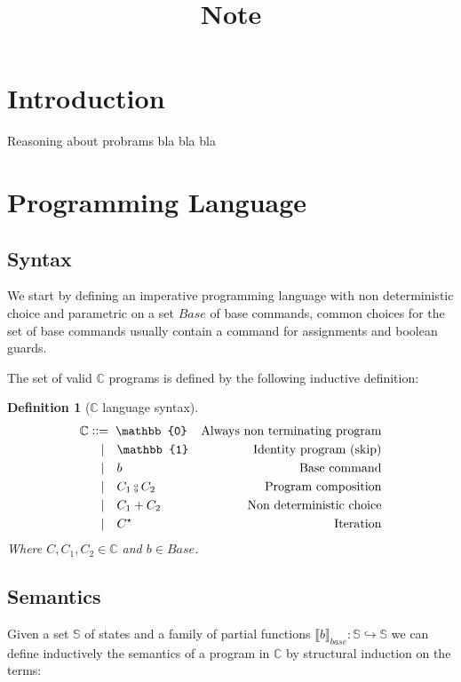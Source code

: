 \documentclass{article}
\title{Note}
\newtheorem{definition}{Definition}
\newcommand*{\sem}[1]{
    \llbracket #1 \rrbracket
}
\newcommand{\basesem}[2][A]{
    \sem{#2}_{base}
}
\def\fcmp{\mathbin{\raise 0.6ex\hbox{\oalign{\hfil$\scriptscriptstyle      
    \mathrm{o}$\hfil\cr\hfil$\scriptscriptstyle\mathrm{9}$\hfil}}}}
\def\cceq{\mathrel{\vcenter{\hbox{::}}{=}}\;}
\def\smid{\quad|\quad}
\def\prr{\hookrightarrow}
\def\lang{\mathbb{C}}
\def\state{\mathbb{S}}
\begin{document}
\section{Introduction}
Reasoning about probrams bla bla bla

\section{Programming Language}

\subsection{Syntax}
    We start by defining an imperative programming language with non 
    deterministic choice and parametric on a set $Base$ of base commands,
    common choices for the set of base commands usually contain a command
    for assignments and boolean guards.

    The set of valid $\lang$ programs is defined by the following inductive 
    definition:
    \begin{definition}[$\lang$ language syntax]
        \begin{align*}
            \lang & \cceq \mathbb{0}    & \text{Always non terminating program} \\
                  & \smid \mathbb{1}    & \text{Identity program (skip)}\\
                  & \smid b             & \text{Base command}\\
                  & \smid C_1 \fcmp C_2 & \text{Program composition}\\
                  & \smid C_1 + C_2     & \text{Non deterministic choice}\\
                  & \smid C^\star       & \text{Iteration}\\
        \end{align*}
        Where $C, C_1, C_2 \in \lang$ and $b \in Base$.
    \end{definition}

\subsection{Semantics}
    Given a set $\state$ of states and a family of partial functions
    $\basesem{b} : \state \prr \state$ we can define inductively the semantics
    of a program in $\lang$ by structural induction on the terms:
    
\end{document}
